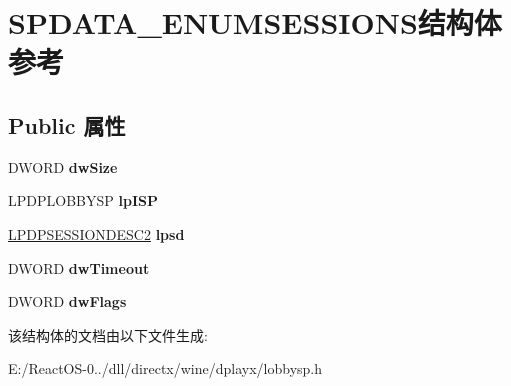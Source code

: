 \hypertarget{struct_s_p_d_a_t_a___e_n_u_m_s_e_s_s_i_o_n_s}{}\section{S\+P\+D\+A\+T\+A\+\_\+\+E\+N\+U\+M\+S\+E\+S\+S\+I\+O\+N\+S结构体 参考}
\label{struct_s_p_d_a_t_a___e_n_u_m_s_e_s_s_i_o_n_s}
\subsection*{Public 属性}
\begin{DoxyCompactItemize}
\item 
\mbox{\label{struct_s_p_d_a_t_a___e_n_u_m_s_e_s_s_i_o_n_s_ace515a0ca555953d985453b580a327d8}} 
D\+W\+O\+RD {\bfseries dw\+Size}
\item 
\mbox{\label{struct_s_p_d_a_t_a___e_n_u_m_s_e_s_s_i_o_n_s_adf953f31ee2d6bcc32b3cb3b5d1fb7c4}} 
L\+P\+D\+P\+L\+O\+B\+B\+Y\+SP {\bfseries lp\+I\+SP}
\item 
\mbox{\label{struct_s_p_d_a_t_a___e_n_u_m_s_e_s_s_i_o_n_s_a191a46a724adb78214330579d6c2f4c9}} 
\hyperlink{structtag_d_p_s_e_s_s_i_o_n_d_e_s_c2}{L\+P\+D\+P\+S\+E\+S\+S\+I\+O\+N\+D\+E\+S\+C2} {\bfseries lpsd}
\item 
\mbox{\label{struct_s_p_d_a_t_a___e_n_u_m_s_e_s_s_i_o_n_s_ac29e26e1d7b3c253a08f8f998f17d067}} 
D\+W\+O\+RD {\bfseries dw\+Timeout}
\item 
\mbox{\label{struct_s_p_d_a_t_a___e_n_u_m_s_e_s_s_i_o_n_s_aa7a53b357c7bc9411806b12136cdd493}} 
D\+W\+O\+RD {\bfseries dw\+Flags}
\end{DoxyCompactItemize}


该结构体的文档由以下文件生成\+:\begin{DoxyCompactItemize}
\item 
E\+:/\+React\+O\+S-\/0../dll/directx/wine/dplayx/lobbysp.\+h\end{DoxyCompactItemize}
